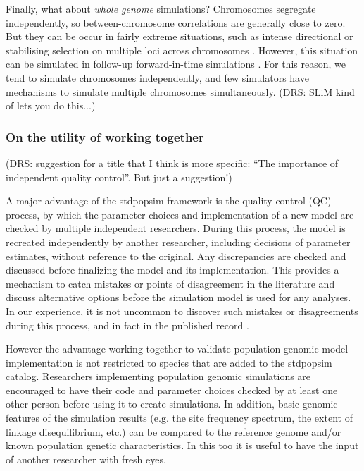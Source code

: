 \documentclass[hidelinks]{article}
\begin{document}
Finally, what about \emph{whole genome} simulations? Chromosomes
segregate independently, so between-chromosome correlations are generally close
to zero. But they can be occur in fairly extreme situations, such as intense
directional or stabilising selection on multiple loci across chromosomes
\citep{Bulmer1971, Lara2022}. However, this situation can be simulated in
follow-up forward-in-time simulations \citep{Haller2018, Gaynor2020}. For
this reason, we tend to simulate chromosomes independently, and few
simulators have mechanisms to simulate
multiple chromosomes simultaneously. (DRS: SLiM kind of lets you do this...)

\hypertarget{on-the-utility-of-working-together}{%
\subsubsection*{On the utility of working
together}\label{on-the-utility-of-working-together}}
(DRS: suggestion for a title that I think is more specific:
 ``The importance of independent quality control''. But just a suggestion!)

A major advantage of the stdpopsim framework is the quality control (QC)
process, by which the parameter choices and implementation of a new
model are checked by multiple independent researchers. During this
process, the model is recreated independently by another researcher,
including decisions of parameter estimates,
without reference to the original. Any discrepancies are checked and
discussed before finalizing the model and its implementation. This
provides a mechanism to catch mistakes or points of disagreement in 
the literature and discuss alternative options
before the simulation model is used for any analyses. In our experience,
it is not uncommon to discover such mistakes or disagreements during
this process, and in fact in the published record \citep{Ragsdale2020}.

However the advantage working together to validate population genomic
model implementation is not restricted to species that are added to
the stdpopsim catalog. Researchers implementing population genomic
simulations are encouraged to have their code and parameter choices
checked by at least one other person before using it to create
simulations. In addition, basic genomic features of the simulation
results (e.g. the site frequency spectrum, the extent of linkage disequilibrium, etc.)
can be compared to the reference genome and/or known population
genetic characteristics. In this too it is useful to have the input
of another researcher with fresh eyes.
\end{document}
